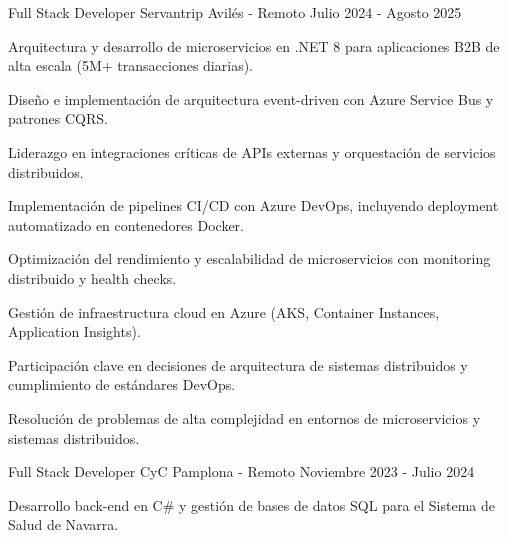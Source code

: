 
\begin{cventries}
    \cventry
    {Full Stack Developer} %
    {Servantrip} %
    {Avilés - Remoto} %
    {Julio 2024 - Agosto 2025} %
    {
        \begin{cvitems} %
            \item {Arquitectura y desarrollo de microservicios en .NET 8 para aplicaciones B2B de alta escala (5M+ transacciones diarias).}
            \item {Diseño e implementación de arquitectura event-driven con Azure Service Bus y patrones CQRS.}
            \item {Liderazgo en integraciones críticas de APIs externas y orquestación de servicios distribuidos.}
            \item {Implementación de pipelines CI/CD con Azure DevOps, incluyendo deployment automatizado en contenedores Docker.}
            \item {Optimización del rendimiento y escalabilidad de microservicios con monitoring distribuido y health checks.}
            \item {Gestión de infraestructura cloud en Azure (AKS, Container Instances, Application Insights).}
            \item {Participación clave en decisiones de arquitectura de sistemas distribuidos y cumplimiento de estándares DevOps.}
            \item {Resolución de problemas de alta complejidad en entornos de microservicios y sistemas distribuidos.}
        \end{cvitems}
    }
    \cventry
    {Full Stack Developer} %
    {CyC} %
    {Pamplona - Remoto} %
    {Noviembre 2023 - Julio 2024} %
    {
        \begin{cvitems}
            \item {Desarrollo back-end en C# y gestión de bases de datos SQL para el Sistema de Salud de Navarra.}

\end{cvitems}}
\end{cventries}
